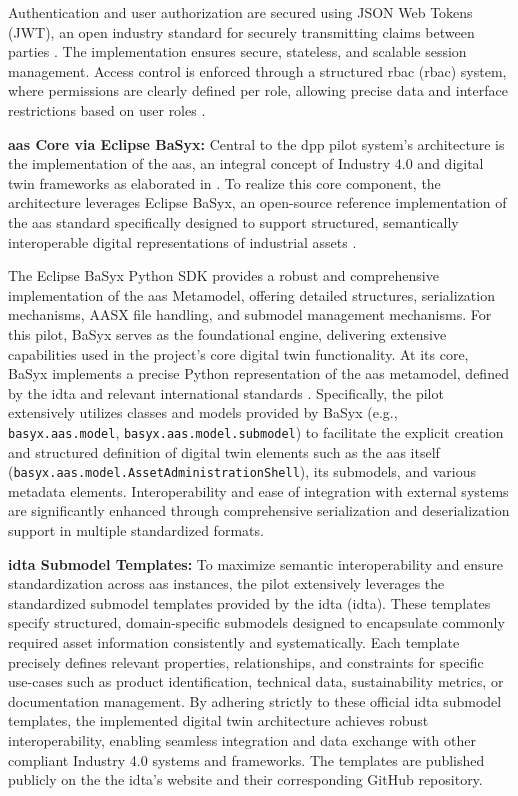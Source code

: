 Authentication and user authorization are secured using JSON Web Tokens (JWT), an open industry standard for securely transmitting claims between parties \autocite{Jones.2015}. The implementation ensures secure, stateless, and scalable session management. Access control is enforced through a structured \acrlong{rbac} (\acrshort{rbac}) system, where permissions are clearly defined per role, allowing precise data and interface restrictions based on user roles \autocite{Ferraiolo.1992}.

\textbf{\ac{aas} Core via Eclipse BaSyx:}
Central to the \ac{dpp} pilot system's architecture is the implementation of the \acrlong{aas}, an integral concept of Industry 4.0 and digital twin frameworks as elaborated in . To realize this core component, the architecture leverages Eclipse BaSyx, an open-source reference implementation of the \ac{aas} standard specifically designed to support structured, semantically interoperable digital representations of industrial assets \autocite{EclipseFoundation.n.d.}.

The Eclipse BaSyx Python SDK provides a robust and comprehensive implementation of the \ac{aas} Metamodel, offering detailed structures, serialization mechanisms, AASX file handling, and submodel management mechanisms. For this pilot, BaSyx serves as the foundational engine, delivering extensive capabilities used in the project's core digital twin functionality. At its core, BaSyx implements a precise Python representation of the \ac{aas} metamodel, defined by the \ac{idta} and relevant international standards \autocite{IDTA.2025}. Specifically, the pilot extensively utilizes classes and models provided by BaSyx (e.g., \verb|basyx.aas.model|, \verb|basyx.aas.model.submodel|) to facilitate the explicit creation and structured definition of digital twin elements such as the \acrlong{aas} itself (\verb|basyx.aas.model.AssetAdministrationShell|), its submodels, and various metadata elements. Interoperability and ease of integration with external systems are significantly enhanced through comprehensive serialization and deserialization support in multiple standardized formats. \autocite{EclipseBaSyx.n.d., IDTA.2024}

\textbf{\ac{idta} Submodel Templates:}
To maximize semantic interoperability and ensure standardization across \ac{aas} instances, the pilot extensively leverages the standardized submodel templates provided by the \acrlong{idta} (\acrshort{idta}). These templates specify structured, domain-specific submodels designed to encapsulate commonly required asset information consistently and systematically. Each template precisely defines relevant properties, relationships, and constraints for specific use-cases such as product identification, technical data, sustainability metrics, or documentation management. By adhering strictly to these official \ac{idta} submodel templates, the implemented digital twin architecture achieves robust interoperability, enabling seamless integration and data exchange with other compliant Industry 4.0 systems and frameworks. The templates are published publicly on the the \ac{idta}'s website and their corresponding GitHub repository. \autocite{IDTA.n.d.}

